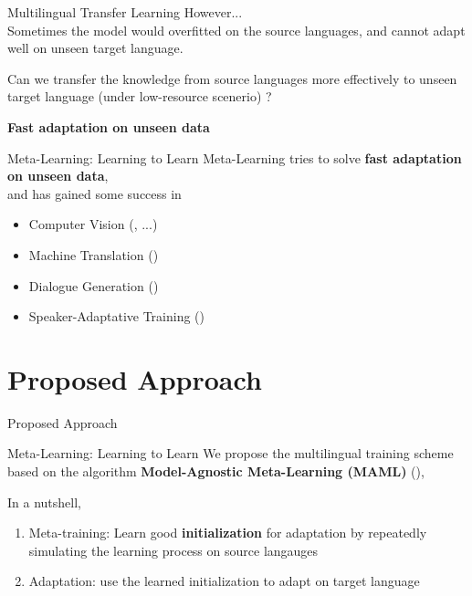 \documentclass{beamer}
\begin{document}
\begin{frame}[t]{Multilingual Transfer Learning}
  However...\\
  Sometimes the model would overfitted on the source languages, and cannot adapt well on unseen target language.

  \vspace{1em}
  \pause
  Can we transfer the knowledge from source languages more effectively to unseen target language (under low-resource scenerio) ?

  \vspace{1em}

  \pause

  \center \textbf{Fast adaptation on unseen data}
\end{frame}

\begin{frame}[t]{Meta-Learning: Learning to Learn}
  Meta-Learning tries to solve \textbf{fast adaptation on unseen data}, \\
  and has gained some success in
  \begin{itemize}
    \item Computer Vision (\citealt{snell2017prototypical}, \citealt{rusu2018meta} ...)
    \item Machine Translation (\citealt{gu2018meta})
    \item Dialogue Generation (\citealt{mi2019meta})
    \item Speaker-Adaptative Training (\citealt{klejch2019speaker})
  \end{itemize}
\end{frame}

\section{Proposed Approach}
\begin{frame}
	\begin{center}
    \LARGE{Proposed Approach}
	\end{center}
\end{frame}

\begin{frame}[t]{Meta-Learning: Learning to Learn}
  We propose the multilingual training scheme based on the algorithm \textbf{Model-Agnostic Meta-Learning (MAML)} (\citealt{finn2017model}),

  \vspace{3em}

  In a nutshell,
  \begin{enumerate}
    \item Meta-training: Learn good \textbf{initialization} for adaptation by repeatedly simulating the learning process on source langauges
    \item Adaptation: use the learned initialization to adapt on target language
  \end{enumerate}
\end{frame}
\end{document}
